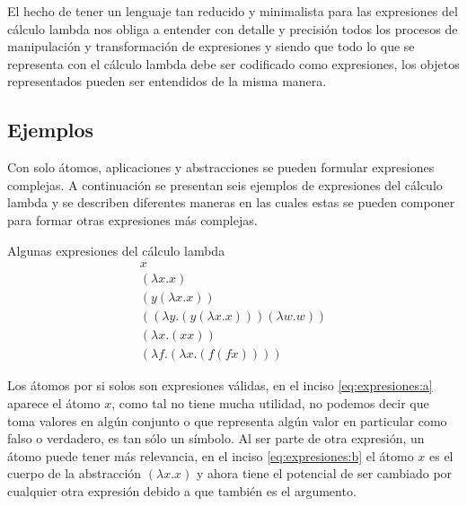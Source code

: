 El hecho de tener un lenguaje tan reducido y minimalista para las expresiones del cálculo lambda nos obliga a entender con detalle y precisión todos los procesos de manipulación y transformación de expresiones y siendo que todo lo que se representa con el cálculo lambda debe ser codificado como expresiones, los objetos representados pueden ser entendidos de la misma manera.

\subsection{Ejemplos}
\label{sec:ejemplos}

Con solo átomos, aplicaciones y abstracciones se pueden formular expresiones complejas. A continuación se presentan seis ejemplos de expresiones del cálculo lambda y se describen diferentes maneras en las cuales estas se pueden componer para formar otras expresiones más complejas.

\begin{exmp}
  Algunas expresiones del cálculo lambda
  \label{exmp:expresiones}
  \begin{subequations}
    \begin{gather}
      \label{eq:expresiones:a} \tag{a}
      x \\
      \label{eq:expresiones:b} \tag{b}
      (λx.x) \\
      \label{eq:expresiones:c} \tag{c}
      (y(λx.x)) \\
      \label{eq:expresiones:d} \tag{d}
      ((λy.(y(λx.x)))(λw.w)) \\
      \label{eq:expresiones:e} \tag{e}
      (λx.(x x)) \\
      \label{eq:expresiones:f} \tag{f}
      (λf.(λx.(f(f x))))
    \end{gather}
  \end{subequations}
\end{exmp}


Los átomos por si solos son expresiones válidas, en el inciso \eqref{eq:expresiones:a} aparece el átomo \( x \), como tal no tiene mucha utilidad, no podemos decir que toma valores en algún conjunto o que representa algún valor en particular como falso o verdadero, es tan sólo un símbolo. Al ser parte de otra expresión, un átomo puede tener más relevancia, en el inciso \eqref{eq:expresiones:b} el átomo \( x \) es el cuerpo de la abstracción \( (λx.x) \) y ahora tiene el potencial de ser cambiado por cualquier otra expresión debido a que también es el argumento.


